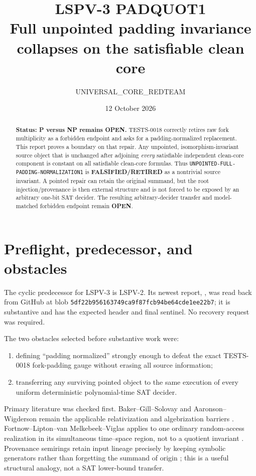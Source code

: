 \documentclass[11pt]{article}
\title{LSPV-3 PADQUOT1\\Full unpointed padding invariance collapses on the satisfiable clean core}
\author{UNIVERSAL\_CORE\_REDTEAM}
\date{12 October 2026}
\newcommand{\OPEN}{\textbf{OPEN}}
\newcommand{\RETIRED}{\textbf{FALSIFIED/RETIRED}}
\begin{document}
\maketitle

\begin{abstract}
\textbf{Status: P versus NP remains OPEN.}  TESTS-0018 correctly retires raw
fork multiplicity as a forbidden endpoint and asks for a padding-normalized
replacement.  This report proves a boundary on that repair.  Any unpointed,
isomorphism-invariant source object that is unchanged after adjoining
\emph{every} satisfiable independent clean-core component is constant on all
satisfiable clean-core formulas.  Thus
\texttt{UNPOINTED-FULL-PADDING-NORMALIZATION1} is \RETIRED{} as a nontrivial
source invariant.  A pointed repair can retain the original summand, but the
root injection/provenance is then external structure and is not forced to be
exposed by an arbitrary one-bit SAT decider.  The resulting arbitrary-decider
transfer and model-matched forbidden endpoint remain \OPEN.
\end{abstract}

\section{Preflight, predecessor, and obstacles}

The cyclic predecessor for LSPV-3 is LSPV-2.  Its newest report,
,
was read back from GitHub at blob
\texttt{5df22b956163749ca9f87fcb94be64cde1ee22b7}; it is substantive and has
the expected header and final sentinel.  No recovery request was required.

The two obstacles selected before substantive work were:
\begin{enumerate}[leftmargin=1.7em]
\item defining ``padding normalized'' strongly enough to defeat the exact
      TESTS-0018 fork-padding gauge without erasing all source information;
\item transferring any surviving pointed object to the same execution of
      every uniform deterministic polynomial-time SAT decider.
\end{enumerate}

Primary literature was checked first.  Baker--Gill--Solovay and
Aaronson--Wigderson remain the applicable relativization and algebrization
barriers \cite{BGS75,AW09}.  Fortnow--Lipton--van Melkebeek--Viglas applies
to one ordinary random-access realization in its simultaneous time--space
region, not to a quotient invariant \cite{FLMV05}.  Provenance semirings
retain input lineage precisely by keeping symbolic generators rather than
forgetting the summand of origin \cite{GKT07}; this is a useful structural
analogy, not a SAT lower-bound transfer.
\end{document}
